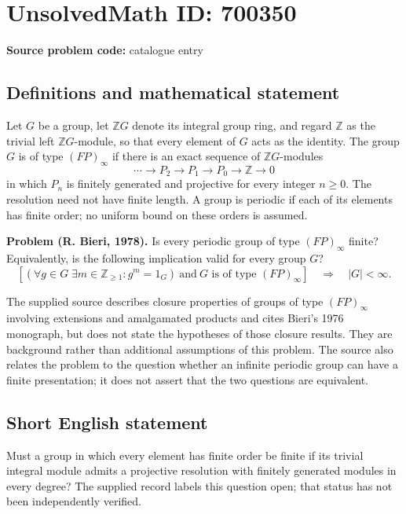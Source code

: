 \documentclass[11pt]{article}
\newcommand{\Z}{\mathbb{Z}}
\begin{document}
\section*{UnsolvedMath ID: 700350}
\textbf{Source problem code:} catalogue entry
\subsection{Definitions and mathematical statement}
Let \(G\) be a group, let \(\Z G\) denote its integral group ring, and regard \(\Z\) as the trivial left \(\Z G\)-module, so that every element of \(G\) acts as the identity. The group \(G\) is of type \((FP)_{\infty}\) if there is an exact sequence of \(\Z G\)-modules
\[
\cdots \longrightarrow P_2 \longrightarrow P_1 \longrightarrow P_0 \longrightarrow \Z \longrightarrow 0
\]
in which \(P_n\) is finitely generated and projective for every integer \(n\geq 0\). The resolution need not have finite length. A group is periodic if each of its elements has finite order; no uniform bound on these orders is assumed.

\textbf{Problem (R. Bieri, 1978).} Is every periodic group of type \((FP)_{\infty}\) finite? Equivalently, is the following implication valid for every group \(G\)?
\[
\left[\left(\forall g\in G\;\exists m\in\Z_{\geq 1}:g^m=1_G\right)\ \text{and}\ G\text{ is of type }(FP)_{\infty}\right]
\quad\Longrightarrow\quad |G|<\infty.
\]

The supplied source describes closure properties of groups of type \((FP)_{\infty}\) involving extensions and amalgamated products and cites Bieri's 1976 monograph, but does not state the hypotheses of those closure results. They are background rather than additional assumptions of this problem. The source also relates the problem to the question whether an infinite periodic group can have a finite presentation; it does not assert that the two questions are equivalent.
\subsection{Short English statement}
Must a group in which every element has finite order be finite if its trivial integral module admits a projective resolution with finitely generated modules in every degree? The supplied record labels this question open; that status has not been independently verified.
\end{document}
